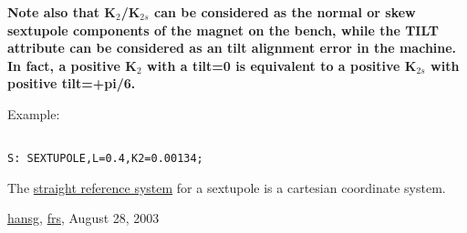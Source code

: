 \textbf{  Note also that K$_2$/K$_{2s}$ can be considered as the normal or skew sextupole components of the magnet on the bench, while the TILT attribute can be considered as an tilt alignment error in the machine. In fact, a positive K$_2$ with a tilt=0 is equivalent to a positive K$_{2s}$ with positive tilt=+pi/6.  }

Example: 
\begin{verbatim}

S: SEXTUPOLE,L=0.4,K2=0.00134;
\end{verbatim} The \href{local_system.html#straight}{straight reference system} for a sextupole is a cartesian coordinate system.  

\href{http://www.cern.ch/Hans.Grote/hansg_sign.html}{hansg}, \href{http://www.cern.ch/Frank.Schmidt/frs_sign.html}{frs}, August 28, 2003  

